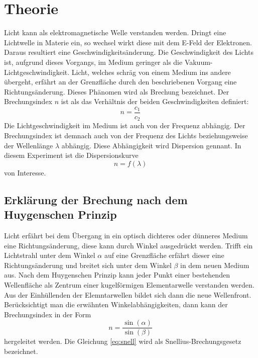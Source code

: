\section{Theorie}
\label{sec:Theorie}
Licht kann als elektromagnetische Welle verstanden werden.
Dringt eine Lichtwelle in %
Materie ein, so wechsel wirkt diese mit dem E-Feld der Elektronen.
Daraus resultiert eine Geschwindigkeitsänderung.
Die Geschwindigkeit des Lichts ist, aufgrund dieses Vorgangs, im Medium geringer als die Vakuum-Lichtgeschwindigkeit.
Licht, welches schräg von einem Medium ins andere übergeht, erfährt an der Grenzfläche durch den beschriebenen Vorgang eine Richtungsänderung.
Dieses Phänomen wird als Brechung bezeichnet.
Der Brechungsindex $n$ ist als das Verhältnis der beiden Geschwindigkeiten definiert:
\begin{equation}
  n= \frac{c_1}{c_2}
\end{equation}
Die Lichtgeschwindigkeit im Medium ist auch von der Frequenz abhängig.
Der Brechungsindex ist demnach auch von der Frequenz des Lichts beziehungsweise der Wellenlänge $\lambda$ abhängig.
Diese Abhängigkeit wird Dispersion gennant.
In diesem Experiment ist die Dispersionskurve
\begin{equation}
  n= f(\lambda)
\end{equation}
von Interesse.
\subsection{Erklärung der Brechung nach dem Huygenschen Prinzip}
Licht erfährt bei dem Übergang in ein optisch dichteres oder dünneres Medium eine Richtungsänderung, diese kann durch Winkel ausgedrückt werden.
Trifft ein Lichtstrahl unter dem Winkel $\alpha$ auf eine Grenzfläche erfährt dieser eine Richtungsänderung und breitet sich unter dem Winkel $\beta$ in dem neuen Medium aus.
Nach dem Huygenschen Prinzip kann jeder Punkt einer bestehenden Wellenfläche als Zentrum einer kugelförmigen Elementarwelle verstanden werden.
Aus der Einhüllenden der Elemntarwellen bildet sich dann die neue Wellenfront.
Berücksichtigt man die erwähnten Winkelabhängigkeiten, dann kann der Brechungsindex in der Form
\begin{equation}
  \label{eq:snell}
  n = \frac{\sin(\alpha)}{\sin(\beta)}
\end{equation}
hergeleitet werden.
Die Gleichung \eqref{eq:snell} wird als Snellius-Brechungsgesetz bezeichnet.
